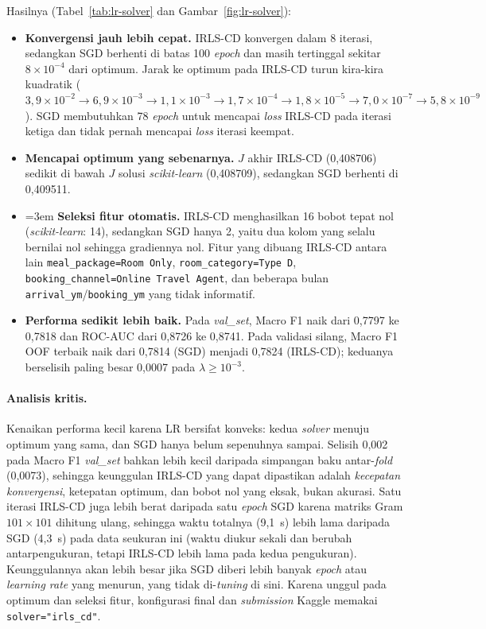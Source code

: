 Hasilnya (Tabel~\ref{tab:lr-solver} dan Gambar~\ref{fig:lr-solver}):
\begin{itemize}
	\item \textbf{Konvergensi jauh lebih cepat.} IRLS-CD konvergen dalam 8 iterasi, sedangkan SGD berhenti di batas 100 \textit{epoch} dan masih tertinggal sekitar $8 \times 10^{-4}$ dari optimum. Jarak ke optimum pada IRLS-CD turun kira-kira kuadratik ($3{,}9 \times 10^{-2} \to 6{,}9 \times 10^{-3} \to 1{,}1 \times 10^{-3} \to 1{,}7 \times 10^{-4} \to 1{,}8 \times 10^{-5} \to 7{,}0 \times 10^{-7} \to 5{,}8 \times 10^{-9}$). SGD membutuhkan 78 \textit{epoch} untuk mencapai \textit{loss} IRLS-CD pada iterasi ketiga dan tidak pernah mencapai \textit{loss} iterasi keempat.
	\item \textbf{Mencapai optimum yang sebenarnya.} $J$ akhir IRLS-CD (0,408706) sedikit di bawah $J$ solusi \textit{scikit-learn} (0,408709), sedangkan SGD berhenti di 0,409511.
	\item \emergencystretch=3em \textbf{Seleksi fitur otomatis.} IRLS-CD menghasilkan 16 bobot tepat nol (\textit{scikit-learn}: 14), sedangkan SGD hanya 2, yaitu dua kolom yang selalu bernilai nol sehingga gradiennya nol. Fitur yang dibuang IRLS-CD antara lain \texttt{meal\_package=\allowbreak Room Only}, \texttt{room\_category=\allowbreak Type D}, \texttt{booking\_channel=\allowbreak Online Travel Agent}, dan beberapa bulan \texttt{arrival\_ym}/\texttt{booking\_ym} yang tidak informatif.
	\item \textbf{Performa sedikit lebih baik.} Pada \textit{val\_set}, Macro F1 naik dari 0,7797 ke 0,7818 dan ROC-AUC dari 0,8726 ke 0,8741. Pada validasi silang, Macro F1 OOF terbaik naik dari 0,7814 (SGD) menjadi 0,7824 (IRLS-CD); keduanya berselisih paling besar 0,0007 pada $\lambda \ge 10^{-3}$.
\end{itemize}

\paragraph{Analisis kritis.} Kenaikan performa kecil karena LR bersifat konveks: kedua \textit{solver} menuju optimum yang sama, dan SGD hanya belum sepenuhnya sampai. Selisih 0,002 pada Macro F1 \textit{val\_set} bahkan lebih kecil daripada simpangan baku antar-\textit{fold} (0,0073), sehingga keunggulan IRLS-CD yang dapat dipastikan adalah \textit{kecepatan konvergensi}, ketepatan optimum, dan bobot nol yang eksak, bukan akurasi. Satu iterasi IRLS-CD juga lebih berat daripada satu \textit{epoch} SGD karena matriks Gram $101 \times 101$ dihitung ulang, sehingga waktu totalnya (9,1~s) lebih lama daripada SGD (4,3~s) pada data seukuran ini (waktu diukur sekali dan berubah antarpengukuran, tetapi IRLS-CD lebih lama pada kedua pengukuran). Keunggulannya akan lebih besar jika SGD diberi lebih banyak \textit{epoch} atau \textit{learning rate} yang menurun, yang tidak di-\textit{tuning} di sini. Karena unggul pada optimum dan seleksi fitur, konfigurasi final dan \textit{submission} Kaggle memakai \texttt{solver="irls\_cd"}.
